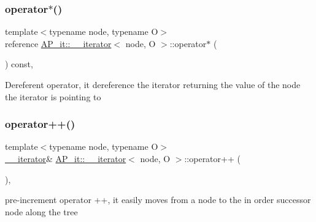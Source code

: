 \subsubsection{\texorpdfstring{operator$\ast$()}{operator*()}}
{\footnotesize\ttfamily template$<$typename node, typename O$>$ \\
reference \hyperlink{classAP__it_1_1____iterator}{A\+P\+\_\+it\+::\+\_\+\+\_\+iterator}$<$ node, O $>$\+::operator$\ast$ (\begin{DoxyParamCaption}{ }\end{DoxyParamCaption}) const\hspace{0.3cm}{\ttfamily [inline]}, {\ttfamily [noexcept]}}

Dereferent operator, it dereference the iterator returning the value of the node the iterator is pointing to \mbox{\label{classAP__it_1_1____iterator_a54350866b6f1b6a9be788805a1982142}} 
\subsubsection{\texorpdfstring{operator++()}{operator++()}\hspace{0.1cm}{\footnotesize\ttfamily [1/2]}}
{\footnotesize\ttfamily template$<$typename node, typename O$>$ \\
\hyperlink{classAP__it_1_1____iterator}{\+\_\+\+\_\+iterator}\& \hyperlink{classAP__it_1_1____iterator}{A\+P\+\_\+it\+::\+\_\+\+\_\+iterator}$<$ node, O $>$\+::operator++ (\begin{DoxyParamCaption}{ }\end{DoxyParamCaption})\hspace{0.3cm}{\ttfamily [inline]}, {\ttfamily [noexcept]}}

pre-\/increment operator ++, it easily moves from a node to the in order successor node along the tree \mbox{\label{classAP__it_1_1____iterator_a690a182c9ef272c5acca82bb2dfe211e}} 
